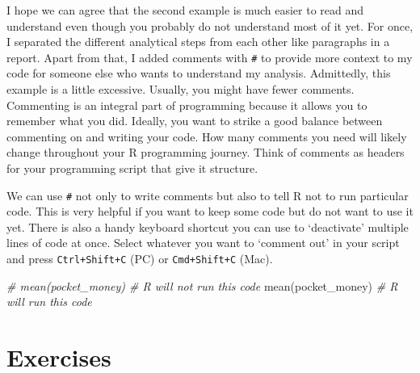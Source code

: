 \documentclass[
]{book}
\newenvironment{Shaded}{\begin{snugshade}}{\end{snugshade}}
\newcommand{\CommentTok}[1]{\textcolor[rgb]{0.56,0.35,0.01}{\textit{#1}}}
\newcommand{\FunctionTok}[1]{\textcolor[rgb]{0.00,0.00,0.00}{#1}}
\newcommand{\NormalTok}[1]{#1}
\begin{document}
I hope we can agree that the second example is much easier to read and understand even though you probably do not understand most of it yet. For once, I separated the different analytical steps from each other like paragraphs in a report. Apart from that, I added comments with \texttt{\#} to provide more context to my code for someone else who wants to understand my analysis. Admittedly, this example is a little excessive. Usually, you might have fewer comments. Commenting is an integral part of programming because it allows you to remember what you did. Ideally, you want to strike a good balance between commenting on and writing your code. How many comments you need will likely change throughout your R programming journey. Think of comments as headers for your programming script that give it structure.

We can use \texttt{\#} not only to write comments but also to tell R not to run particular code. This is very helpful if you want to keep some code but do not want to use it yet. There is also a handy keyboard shortcut you can use to `deactivate' multiple lines of code at once. Select whatever you want to `comment out' in your script and press \texttt{Ctrl+Shift+C} (PC) or \texttt{Cmd+Shift+C} (Mac).

\begin{Shaded}
\begin{Highlighting}[]
\CommentTok{\# mean(pocket\_money) \# R will not run this code}
\FunctionTok{mean}\NormalTok{(pocket\_money)   }\CommentTok{\# R will run this code}
\end{Highlighting}
\end{Shaded}

\hypertarget{exercises-chapter-5}{%
\section{Exercises}\label{exercises-chapter-5}}
\end{document}
